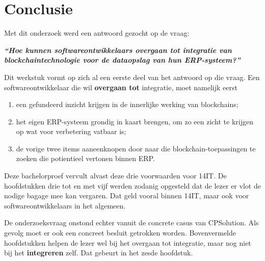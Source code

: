 
\chapter{Conclusie}
\label{ch:conclusie}



Met dit onderzoek werd een antwoord gezocht op de vraag:

\begin{center}
	\textit{\textbf{``Hoe kunnen softwareontwikkelaars overgaan tot integratie van blockchaintechnologie voor de dataopslag van hun ERP-systeem?''}}
\end{center}

Dit werkstuk vormt op zich al een eerste deel van het antwoord op die vraag. Een softwareontwikkelaar die wil \textbf{overgaan tot} integratie, moet namelijk eerst
\begin{enumerate}
	\item een gefundeerd inzicht krijgen in de innerlijke werking van blockchains;
	\item het eigen ERP-systeem grondig in kaart brengen, om zo een zicht te krijgen op wat voor verbetering vatbaar is;
	\item de vorige twee items aaneenknopen door naar die blockchain-toepassingen te zoeken die potientieel vertonen binnen ERP.
\end{enumerate}

Deze bachelorproef vervult alvast deze drie voorwaarden voor 14IT. De hoofdstukken drie tot en met vijf werden zodanig opgesteld dat de lezer er vlot de nodige bagage mee kan vergaren. Dat geld vooral binnen 14IT, maar ook voor softwareontwikkelaars in het algemeen.

De onderzoeksvraag onstond echter vanuit de concrete casus van CPSolution. Als gevolg moet er ook een concreet besluit getrokken worden. Bovenvermelde hoofdstukken helpen de lezer wel bij het overgaan tot integratie, maar nog niet bij het \textbf{integreren} zelf. Dat gebeurt in het zesde hoofdstuk.

